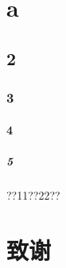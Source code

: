\documentclass[oneside,10pt]{article}
\begin{document}
\section{a}
\subsection{2}
\subsubsection{3}
\paragraph{4}
\subparagraph{5}
??11??22??\cite{cal_pde,kingma2014adam,guo_convolutional_2016}











\newpage
%
\titleformat{\section}{\centering\LARGE\bfseries}{}{1em}{}

\newpage
\section{致谢}










\newpage
\appendix
{}
\end{document}
